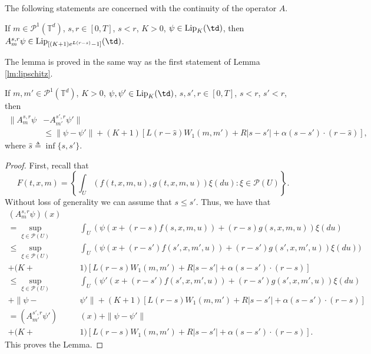 \documentclass[a4paper,12pt]{article}
\newcommand{\ptd}{\mathcal{P}^1(\mathbb{T}^d)}
\begin{document}
The following statements are concerned with the continuity of the operator $A$.

\begin{lemma}\label{lm:A_lipshitz}
	If $m\in\ptd$, $s,r\in [0,T]$, $s<r$, $K>0$, $\psi\in \mathrm{Lip}_{K}(\td)$, then $A^{s,r}_m\psi\in\mathrm{Lip}_{[(K +1)e^{L(r-s)}-1]}(\td)$. 
\end{lemma} The lemma is proved in the same way as the first statement of Lemma \ref{lm:lipschitz}.



\begin{lemma}\label{lm:A_continuity}
	If $m,m'\in\ptd$, $K>0$, $\psi,\psi'\in \mathrm{Lip}_K(\td)$, $s,s',r\in [0,T]$, $s<r$, $s'<r$, then
	\begin{equation*}\begin{split}\|A^{s,r}_{m}\psi&-A^{s',r}_{m'}\psi'\|\\ &\leq \|\psi-\psi'\|+ (K+1)[L(r-\hat{s})W_1(m,m')+R|s-s'|+\alpha(s-s')\cdot(r-\hat{s})],\end{split}\end{equation*}
	where $\hat{s}\triangleq\inf\{s,s'\}$.
\end{lemma}
\begin{proof}
	First, recall that
	\begin{equation}\label{equal:F_probabilities}
	F(t,x,m)=\left\{ \int_U (f(t,x,m,u),g(t,x,m,u))\xi(du):\xi\in\mathcal{P}(U) \right\}.
	\end{equation} 
	Without loss of generality we can assume that $s\leq s'$. Thus, we have that
	\begin{equation*}\begin{split}
	(A^{s,r}_{m}\psi)(x)\hspace{17pt}&{}\\=\sup_{\xi\in\mathcal{P}(U)}&\int_U (\psi(x+(r-s) f(s,x,m,u))+(r-s)g(s,x,m,u))\xi(du)\\ \leq
	\sup_{\xi\in\mathcal{P}(U)}&\int_U (\psi(x+(r-s') f(s',x,m',u))+(r-s')g(s',x,m',u))\xi(du))\\+(K+&1)[L(r-s)W_1(m,m')+R|s-s'|+\alpha(s-s')\cdot(r-s)]\\ \leq \sup_{\xi\in\mathcal{P}(U)}&\int_U (\psi'(x+(r-s') f(s',x,m',u))+(r-s')g(s',x,m',u))\xi(du)\\ +\|\psi-&\psi'\| +(K+1)[L(r-s)W_1(m,m')+R|s-s'|+\alpha(s-s')\cdot(r-s)]\\ = (A^{s',r}_{m'}\psi')&(x)+\|\psi-\psi'\|\\+(K+&1)[L(r-s)W_1(m,m')+R|s-s'|+\alpha(s-s')\cdot(r-s)].
	\end{split}
	\end{equation*} This proves the Lemma.
\end{proof}
\end{document}
